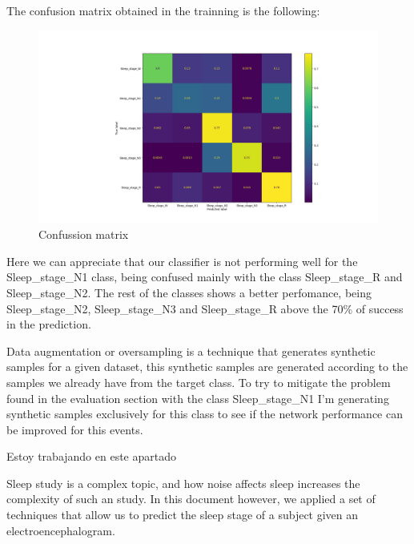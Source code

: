 The confusion matrix obtained in the trainning is the following:

\begin{figure}[H]
\hspace*{-4cm}\includegraphics[scale=.5]{figs/cm.png}
\caption{Confussion matrix}
\label{fig4}
\end{figure}

Here we can appreciate that our classifier is not performing well for the Sleep\_stage\_N1 class, being confused mainly with the class Sleep\_stage\_R and Sleep\_stage\_N2. The rest of the classes shows a better perfomance, being Sleep\_stage\_N2, Sleep\_stage\_N3 and Sleep\_stage\_R above the 70\% of success in the prediction.

Data augmentation or oversampling is a technique that generates synthetic samples for a given dataset, this synthetic samples are generated according to the samples we already have from the target class. To try to mitigate the problem found in the evaluation section with the class Sleep\_stage\_N1 I'm generating synthetic samples exclusively for this class to see if the network performance can be improved for this events.

Estoy trabajando en este apartado

\blindtext

Sleep study is a complex topic, and how noise affects sleep increases the complexity of such an study. In this document however, we applied a set of techniques that allow us to predict the sleep stage of a subject given an electroencephalogram. 


